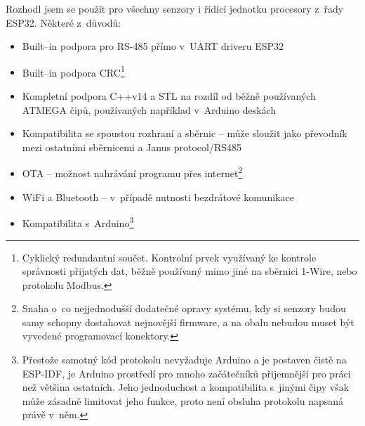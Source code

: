 Rozhodl jsem se použít pro všechny senzory i řídící jednotku procesory z~řady ESP32.
Některé z~důvodů:
\begin{itemize}
    \item Built--in podpora pro RS-485 přímo v~UART driveru ESP32
    \item Built--in podpora CRC\footnote{Cyklický redundantní součet. Kontrolní prvek využívaný ke kontrole správnosti přijatých dat, běžně používaný mimo jiné na sběrnici 1-Wire, nebo protokolu Modbus.}
    \item Kompletní podpora C++v14 a STL na rozdíl od běžně používaných ATMEGA čipů, používaných například v~Arduino deskách
    \item Kompatibilita se spoustou rozhraní a sběrnic -- může sloužit jako převodník mezi ostatními sběrnicemi a Janus protocol/RS485
    \item OTA -- možnost nahrávání programu přes internet\footnote{Snaha o~co nejjednodušší dodatečné opravy systému, kdy si senzory budou samy schopny dostahovat nejnovější firmware, a na obalu nebudou muset být vyvedené programovací konektory.}
    \item WiFi a Bluetooth -- v~případě nutnosti bezdrátové komunikace
    \item Kompatibilita s~Arduino\footnote{Přestože samotný kód protokolu nevyžaduje Arduino a je postaven čistě na ESP-IDF, je Arduino prostředí pro mnoho začátečníků přijemnější pro práci než většina ostatních. Jeho jednoduchost a kompatibilita s~jinými čipy však může zásadně limitovat jeho funkce, proto není obsluha protokolu napsaná právě v~něm.}
\end{itemize}